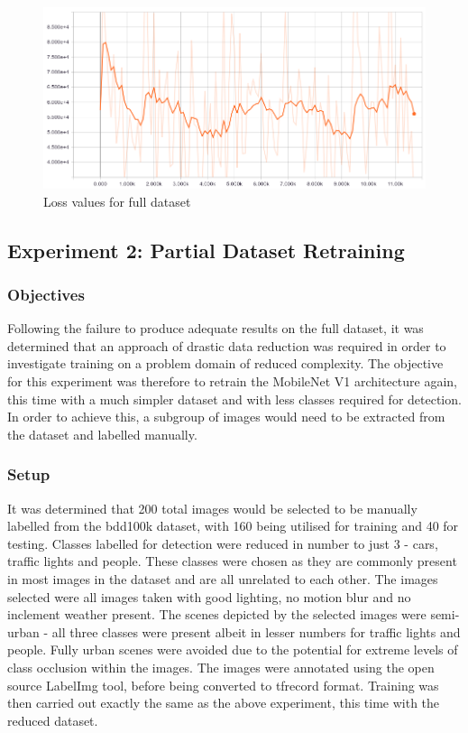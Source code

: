 \documentclass[12pt]{report}
\begin{document}
\vspace{0.5cm}
\begin{figure}[ht!]
	\centering
	\includegraphics[width=12cm]{mobilenet-full-dataset-loss}
	\caption{Loss values for full dataset}
	\label{fig:mobilenet-full-dataset-loss}
\end{figure}

\newpage
\subsection{Experiment 2: Partial Dataset Retraining}
\subsubsection*{Objectives}
\begin{flushleft}
Following the failure to produce adequate results on the full dataset, it was determined that an approach of drastic data reduction was required in order to investigate training on a problem domain of reduced complexity. The objective for this experiment was therefore to retrain the MobileNet V1 architecture again, this time with a much simpler dataset and with less classes required for detection. In order to achieve this, a subgroup of images would need to be extracted from the dataset and labelled manually.
\end{flushleft}

\subsubsection*{Setup}
\begin{flushleft}
It was determined that 200 total images would be selected to be manually labelled from the bdd100k dataset, with 160 being utilised for training and 40 for testing. Classes labelled for detection were reduced in number to just 3 - cars, traffic lights and people. These classes were chosen as they are commonly present in most images in the dataset and are all unrelated to each other. The images selected were all images taken with good lighting, no motion blur and no inclement weather present. The scenes depicted by the selected images were semi-urban - all three classes were present albeit in lesser numbers for traffic lights and people. Fully urban scenes were avoided due to the potential for extreme levels of class occlusion within the images. The images were annotated using the open source LabelImg tool, before being converted to tfrecord format. Training was then carried out exactly the same as the above experiment, this time with the reduced dataset.
\end{flushleft}
\end{document}
